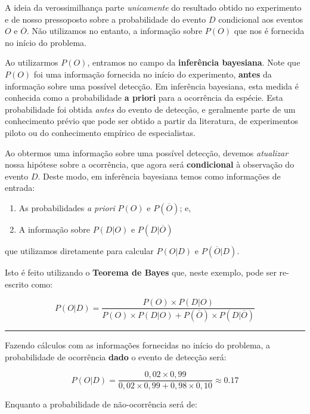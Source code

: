 \documentclass[
]{book}
\begin{document}
A ideia da verossimilhança parte \emph{unicamente} do resultado obtido no experimento e de nosso pressoposto sobre a probabilidade do evento \(D\) condicional aos eventos \(O\) e \(\overline{O}\). Não utilizamos no entanto, a informação sobre \(P(O)\) que nos é fornecida no início do problema.

Ao utilizarmos \(P(O)\), entramos no campo da \textbf{inferência bayesiana}. Note que \(P(O)\) foi uma informação fornecida no início do experimento, \textbf{antes} da informação sobre uma possível detecção. Em inferência bayesiana, esta medida é conhecida como a probabilidade \textbf{a priori} para a ocorrência da espécie. Esta probabilidade foi obtida \emph{antes} do evento de detecção, e geralmente parte de um conhecimento prévio que pode ser obtido a partir da literatura, de experimentos piloto ou do conhecimento empírico de especialistas.

Ao obtermos uma informação sobre uma possível detecção, devemos \emph{atualizar} nossa hipótese sobre a ocorrência, que agora será \textbf{condicional} à observação do evento \(D\). Deste modo, em inferência bayesiana temos como informações de entrada:

\begin{enumerate}
\def\labelenumi{\arabic{enumi}.}
\item
  As probabilidades \emph{a priori} \(P(O)\) e \(P(\overline{O})\); e,
\item
  A informação sobre \(P(D|O)\) e \(P(D|\overline{O})\)
\end{enumerate}

que utilizamos diretamente para calcular \(P(O|D)\) e \(P(\overline{O}|D)\).

Isto é feito utilizando o \textbf{Teorema de Bayes} que, neste exemplo, pode ser re-escrito como:

\[P(O|D) = \frac{P(O) \times P(D|O)}{P(O) \times P(D|O) + P(\overline{O}) \times P(D|\overline{O})}\]

\begin{center}\rule{0.5\linewidth}{0.5pt}\end{center}

Fazendo cálculos com as informações fornecidas no início do problema, a probabilidade de ocorrência \textbf{dado} o evento de detecção será:

\[P(O|D) = \frac{0,02 \times 0,99}{0,02 \times 0,99 + 0,98 \times 0,10} \approx 0.17\]

Enquanto a probabilidade de não-ocorrência será de:
\end{document}
